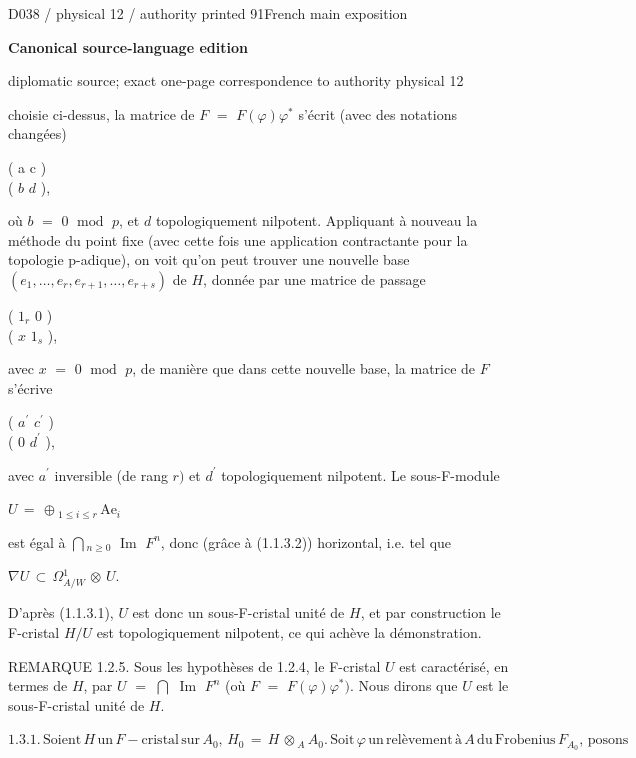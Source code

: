 \documentclass[9pt]{article}
\newcommand{\CanonHeading}[1]{\par\vspace{1.5pt}{\fontsize{8.6}{10.0}\selectfont\sffamily\bfseries\color{Accent} #1\par}\vspace{1.5pt}}
\newcommand{\CanonText}[1]{\par{\fontsize{8.0}{9.35}\selectfont\RaggedRight #1\par}\vspace{2.2pt}}
\newcommand{\CanonDisplay}[1]{\par\vspace{1.2pt}\begin{center}{\fontsize{7.2}{8.4}\selectfont\(\displaystyle #1\)}\end{center}\vspace{1.2pt}}
\newcommand{\LayerTitle}{Canonical source-language edition}
\begin{document}
\noindent\begin{minipage}[t][\dimexpr\textheight-5pt\relax][t]{\textwidth}
{\sffamily\fontsize{7.3}{8.2}\selectfont\color{Quiet} D038 / physical 12 / authority printed 91\hfill French main exposition}
\par{}\vspace{4.5pt}
{\sffamily\fontsize{10.4}{11.6}\selectfont\bfseries\color{Accent} \LayerTitle}
\par{\sffamily\fontsize{6.7}{7.7}\selectfont\color{Quiet} diplomatic source; exact one-page correspondence to authority physical 12}
\vspace{5pt}
\CanonText{choisie ci-dessus, la matrice de \(F\) \(=\) \(F(\varphi{})\varphi{}^{*}\) s'écrit (avec des notations changées)}
\CanonText{( a c )\\( \(b\) \(d\) ),}
\CanonText{où \(b\) \(=\) 0 \(\operatorname{mod}\) \(p\), et \(d\) topologiquement nilpotent. Appliquant à nouveau la méthode du point fixe (avec cette fois une application contractante pour la topologie p-adique), on voit qu'on peut trouver une nouvelle base \((e_{1},\ldots{},e_{r},e_{r+1},\ldots{},e_{r+s})\) de \(H\), donnée par une matrice de passage}
\CanonText{( \(1_{r}\) 0 )\\( \(x\) \(1_{s}\) ),}
\CanonText{avec \(x\) \(=\) 0 \(\operatorname{mod}\) \(p\), de manière que dans cette nouvelle base, la matrice de \(F\) s'écrive}
\CanonText{( \(a^{\prime}\) \(c^{\prime}\) )\\( 0 \(d^{\prime}\) ),}
\CanonText{avec \(a^{\prime}\) inversible (de rang \(r)\) et \(d^{\prime}\) topologiquement nilpotent. Le sous-F-module}
\CanonDisplay{U\,=\,\oplus{}_{1\leq{}i\leq{}r}\,\text{Ae}_{i}}
\CanonText{est égal à \(\bigcap{}_{n\geq{}0}\) \(\operatorname{Im}\) \(F^{n}\), donc (grâce à (1.1.3.2)) horizontal, i.e. tel que}
\CanonDisplay{\nabla{}U\,\subset{}\,\Omega{}^{1}_{A/W}\,\otimes{}\,U.}
\CanonText{D'après (1.1.3.1), \(U\) est donc un sous-F-cristal unité de \(H\), et par construction le F-cristal \(H/U\) est topologiquement nilpotent, ce qui achève la démonstration.}
\CanonText{REMARQUE 1.2.5. Sous les hypothèses de 1.2.4, le F-cristal \(U\) est caractérisé, en termes de \(H\), par \(U\) \(=\) \(\bigcap{}\) \(\operatorname{Im}\) \(F^{n}\) (où \(F\) \(=\) \(F(\varphi{})\varphi{}^{*})\). Nous dirons que \(U\) est le sous-F-cristal unité de \(H\).}
\CanonHeading{1.3. F-cristaux ordinaires.}
\CanonDisplay{1.3.1.\,\text{Soient}\,H\,\text{un}\,F-\text{cristal}\,\text{sur}\,A_{0},\,H_{0}\,=\,H\,\otimes{}_{A}\,A_{0}.\,\text{Soit}\,\varphi{}\,\text{un}\,\text{relèvement}\,\text{à}\,A\,\text{du}\,\text{Frobenius}\,F_{A_{0}},\,\text{posons}}

\end{minipage}
\end{document}
